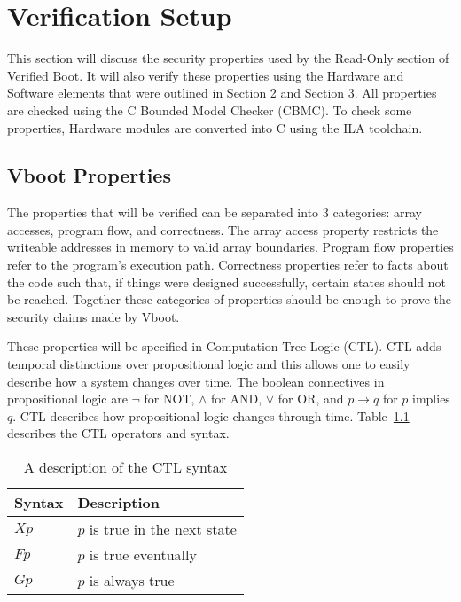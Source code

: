 \chapter{Verification Setup}\label{sec:Verif}

This section will discuss the security properties used by the Read-Only
section of Verified Boot. 
It will also verify these properties using the Hardware and
Software elements that were outlined in Section 2 and Section 3.
All properties are checked using the C Bounded Model Checker (CBMC).
To check some properties, Hardware modules are converted into C using the ILA toolchain.

\section{Vboot Properties}

The properties that will be verified can be separated into 3 categories: array accesses, program flow, and correctness.
The array access property restricts the writeable addresses in memory to valid array boundaries. 
Program flow properties refer to the program's execution path.
Correctness properties refer to facts about the code such that, if things were
designed successfully, certain states should not be reached.
Together these categories of properties should be enough to prove the security claims made by Vboot.

These properties will be specified in Computation Tree Logic (CTL). 
CTL adds temporal distinctions over propositional logic and this allows one to easily describe how a system changes over time.
The boolean connectives in propositional logic are $\lnot$ for NOT, $\land$ for
AND, $\lor$ for OR, and $p \to q$ for $p$ implies $q$.
CTL describes how propositional logic changes through time.
Table~\ref{ctl_syn} describes the CTL operators and syntax.

\begin{table}[!htbp]
    \centering
    \caption{A description of the CTL syntax}\label{ctl_syn}
    \begin{tabular}{ll}
        \toprule Syntax & Description  \\ \midrule 
        $Xp$ & $p$ is true in the next state\\ 
        $Fp$ & $p$ is true eventually\\ 
        $Gp$ & $p$ is always true\\ \bottomrule
    \end{tabular}
\end{table}

